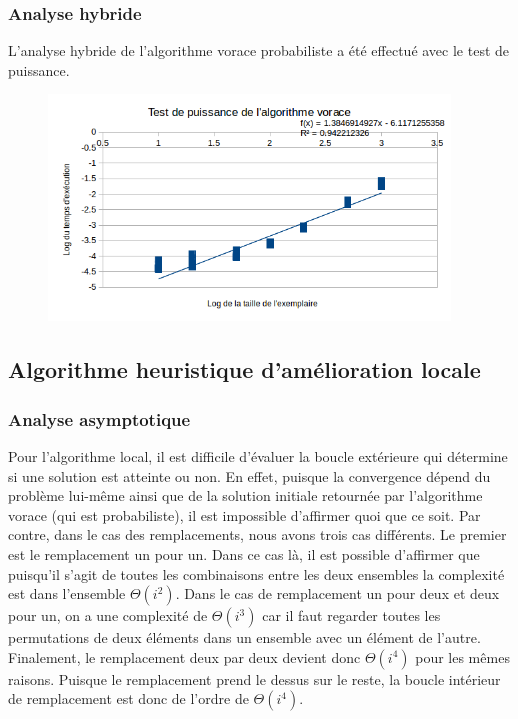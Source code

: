 \documentclass[a4paper, 12pt]{article} %
\begin{document}
\subsubsection*{Analyse hybride}
L'analyse hybride de l'algorithme vorace probabiliste a été effectué avec le test de puissance.
\begin{figure}[H]
    \centering
    \includegraphics[width=0.95\textwidth]{Figure/AlgorithmeVorace}
\end{figure}

\subsection*{Algorithme heuristique d'amélioration locale}
\subsubsection*{Analyse asymptotique}
    Pour l'algorithme local, il est difficile d'évaluer la boucle extérieure qui détermine si une
    solution est atteinte ou non. En effet, puisque la convergence dépend du problème lui-même ainsi que
    de la solution initiale retournée par l'algorithme vorace (qui est probabiliste), il est impossible d'affirmer
    quoi que ce soit. Par contre, dans le cas des remplacements, nous avons trois cas différents. Le premier est 
    le remplacement un pour un. Dans ce cas là, il est possible d'affirmer que puisqu'il s'agit de toutes les combinaisons
    entre les deux ensembles la complexité est dans l'ensemble $\Theta(i^{2})$. Dans le cas de remplacement un pour deux 
    et deux pour un, on a une complexité de $\Theta(i^{3})$ car il faut regarder toutes les permutations de deux éléments dans
    un ensemble avec un élément de l'autre. Finalement, le remplacement deux par deux devient donc $\Theta(i^{4})$ pour 
    les mêmes raisons. Puisque le remplacement prend le dessus sur le reste, la boucle intérieur de remplacement est donc
    de l'ordre de $\Theta(i^{4})$.
\end{document}
